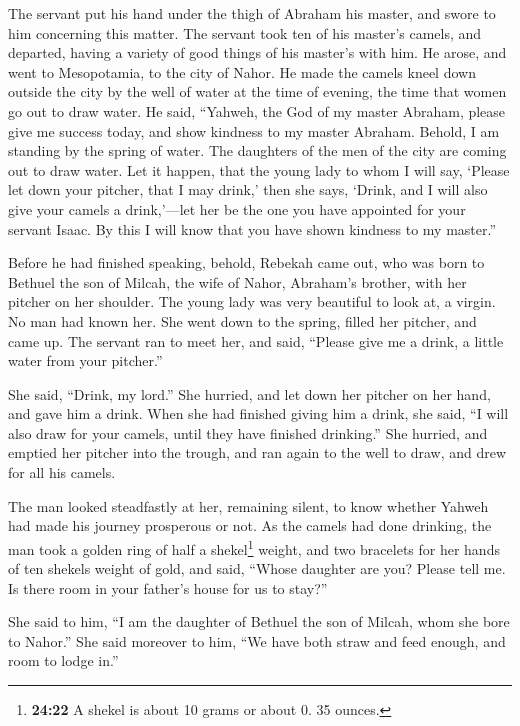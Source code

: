 The servant put his hand under the thigh of Abraham his
master, and swore to him concerning this matter.  The
servant took ten of his master's camels, and departed, having a variety
of good things of his master's with him. He arose, and went to
Mesopotamia, to the city of Nahor.  He made the camels
kneel down outside the city by the well of water at the time of evening,
the time that women go out to draw water.  He said,
``Yahweh, the God of my master Abraham, please give me success today,
and show kindness to my master Abraham.  Behold, I am
standing by the spring of water. The daughters of the men of the city
are coming out to draw water.  Let it happen, that the
young lady to whom I will say, `Please let down your pitcher, that I may
drink,' then she says, `Drink, and I will also give your camels a
drink,'---let her be the one you have appointed for your servant Isaac.
By this I will know that you have shown kindness to my master.''

 Before he had finished speaking, behold, Rebekah came
out, who was born to Bethuel the son of Milcah, the wife of Nahor,
Abraham's brother, with her pitcher on her shoulder.  The
young lady was very beautiful to look at, a virgin. No man had known
her. She went down to the spring, filled her pitcher, and came up.
 The servant ran to meet her, and said, ``Please give me
a drink, a little water from your pitcher.''

 She said, ``Drink, my lord.'' She hurried, and let down
her pitcher on her hand, and gave him a drink.  When she
had finished giving him a drink, she said, ``I will also draw for your
camels, until they have finished drinking.''  She
hurried, and emptied her pitcher into the trough, and ran again to the
well to draw, and drew for all his camels.

 The man looked steadfastly at her, remaining silent, to
know whether Yahweh had made his journey prosperous or not.
 As the camels had done drinking, the man took a golden
ring of half a shekel\footnote{\textbf{24:22} A shekel is about 10 grams
  or about 0. 35 ounces.} weight, and two bracelets for her hands of ten
shekels weight of gold,  and said, ``Whose daughter are
you? Please tell me. Is there room in your father's house for us to
stay?''

 She said to him, ``I am the daughter of Bethuel the son
of Milcah, whom she bore to Nahor.''  She said moreover
to him, ``We have both straw and feed enough, and room to lodge in.''

